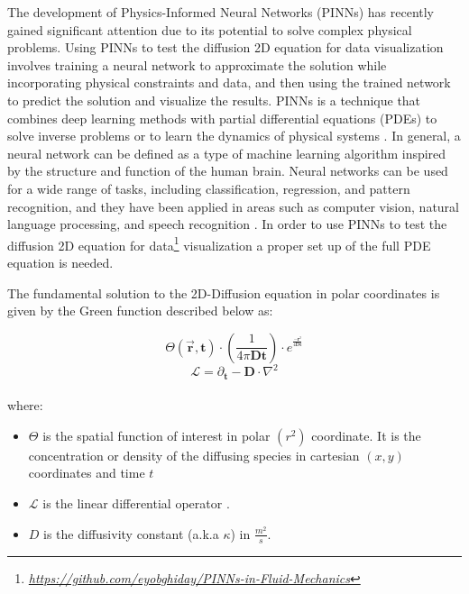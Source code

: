 \renewcommand{\thefootnote}{\alph{footnote}}
The development of Physics-Informed Neural Networks (PINNs) has recently gained significant attention due to its potential to solve complex physical problems. Using PINNs to test the diffusion 2D equation for data visualization involves training a neural network to approximate the solution while incorporating physical constraints and data, and then using the trained network to predict the solution and visualize the results. PINNs is a technique that combines deep learning methods with partial differential equations (PDEs) to solve inverse problems or to learn the dynamics of physical systems \cite{FernandezdelaMata2023}. In general, a neural network can be defined as a type of machine learning algorithm inspired by the structure and function of the human brain. Neural networks can be used for a wide range of tasks, including classification, regression, and pattern recognition, and they have been applied in areas such as computer vision, natural language processing, and speech recognition \cite{Katsnelson2023}. In order to use PINNs to test the diffusion 2D equation for data\footnote{\textit{\href{https://github.com/eyobghiday/PINNs-in-Fluid-Mechanics}{https://github.com/eyobghiday/PINNs-in-Fluid-Mechanics}}} visualization a proper set up of the full PDE equation is needed.

The fundamental solution to the 2D-Diffusion equation in polar coordinates is given by the Green function described below as:


 $$\Theta(\vec{\textbf{r}},\textbf{t})\cdot \left( \frac{1}{4 \pi \textbf{D} \textbf{t}} \right) \cdot e^{ ^ \frac{-\textbf{r}^2}{4 \textbf{D} \textbf{t}}}$$
$$ \textbf{$\mathcal{L}$} = \partial_\textbf{t}-\textbf{D}\cdot\nabla^2$$
\\
where$:$
\begin{itemize}[noitemsep]
\item $\Theta$ is the spatial function of interest in polar $(r^2)$ coordinate. It is the concentration or density of the diffusing species in cartesian $(x,y)$ coordinates and time $t$
\item $\mathcal{L}$ is the linear differential operator \cite{Skinner}\cite{Nair2011}.
\item $D$ is the diffusivity constant (a.k.a $\kappa$) in $\frac{m^2}{s}$.
\end{itemize}

